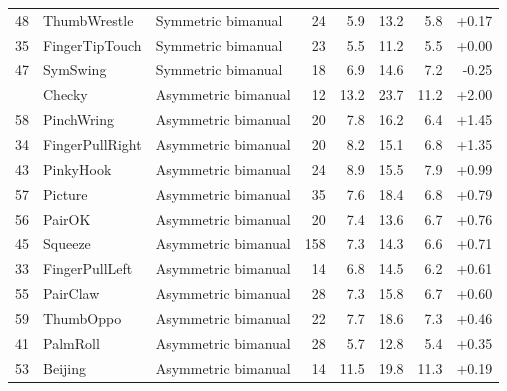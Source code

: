 \begin{table}[h]
\begin{tabular}{rllrrrrr}
48 & ThumbWrestle & Symmetric bimanual & 24 & 5.9 & 13.2 & 5.8 & +0.17 \\
35 & FingerTipTouch & Symmetric bimanual & 23 & 5.5 & 11.2 & 5.5 & +0.00 \\
47 & SymSwing & Symmetric bimanual & 18 & 6.9 & 14.6 & 7.2 & -0.25 \\
\addlinespace[3pt]
54 & Checky & Asymmetric bimanual & 12 & 13.2 & 23.7 & 11.2 & +2.00 \\
58 & PinchWring & Asymmetric bimanual & 20 & 7.8 & 16.2 & 6.4 & +1.45 \\
34 & FingerPullRight & Asymmetric bimanual & 20 & 8.2 & 15.1 & 6.8 & +1.35 \\
43 & PinkyHook & Asymmetric bimanual & 24 & 8.9 & 15.5 & 7.9 & +0.99 \\
57 & Picture & Asymmetric bimanual & 35 & 7.6 & 18.4 & 6.8 & +0.79 \\
56 & PairOK & Asymmetric bimanual & 20 & 7.4 & 13.6 & 6.7 & +0.76 \\
45 & Squeeze & Asymmetric bimanual & 158 & 7.3 & 14.3 & 6.6 & +0.71 \\
33 & FingerPullLeft & Asymmetric bimanual & 14 & 6.8 & 14.5 & 6.2 & +0.61 \\
55 & PairClaw & Asymmetric bimanual & 28 & 7.3 & 15.8 & 6.7 & +0.60 \\
59 & ThumbOppo & Asymmetric bimanual & 22 & 7.7 & 18.6 & 7.3 & +0.46 \\
41 & PalmRoll & Asymmetric bimanual & 28 & 5.7 & 12.8 & 5.4 & +0.35 \\
53 & Beijing & Asymmetric bimanual & 14 & 11.5 & 19.8 & 11.3 & +0.19 \\
\bottomrule
\end{tabular}
\end{table}